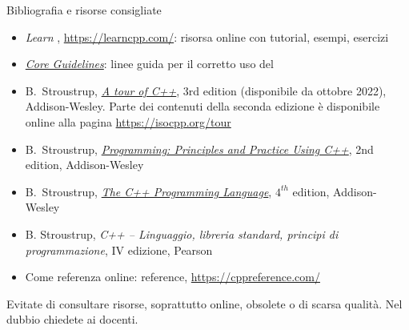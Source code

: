 \begin{frame}{Bibliografia e risorse consigliate}

  \begin{itemize}

  \item \textit{Learn \Cpp{}}, \url{https://learncpp.com/}: risorsa online con
    tutorial, esempi, esercizi

  \item
    \href{https://isocpp.github.io/CppCoreGuidelines/CppCoreGuidelines}{\textit{\Cpp{}
        Core Guidelines}}: linee guida per il corretto uso del \Cpp{}

  \item B.~Stroustrup, \href{https://stroustrup.com/tour3.html}{\textit{A tour
        of C++}}, 3rd edition (disponibile da ottobre 2022), Addison-Wesley.
    Parte dei contenuti della seconda edizione è disponibile online alla pagina
    \url{https://isocpp.org/tour}

  \item B.~Stroustrup,
    \href{https://stroustrup.com/programming.html}{\textit{Programming:
        Principles and Practice Using C++}}, 2nd edition, Addison-Wesley

  \item B.~Stroustrup, \href{https://stroustrup.com/4th.html}{\textit{The C++
        Programming Language}}, $4^{th}$ edition, Addison-Wesley

  \item B. Stroustrup, \textit{C++ -- Linguaggio, libreria standard, principi
      di programmazione}, IV edizione, Pearson

  \item Come referenza online: \Cpp{} reference, \url{https://cppreference.com/}

  \end{itemize}

  Evitate di consultare risorse, soprattutto online, obsolete o di scarsa
  qualità. Nel dubbio chiedete ai docenti.

\end{frame}

